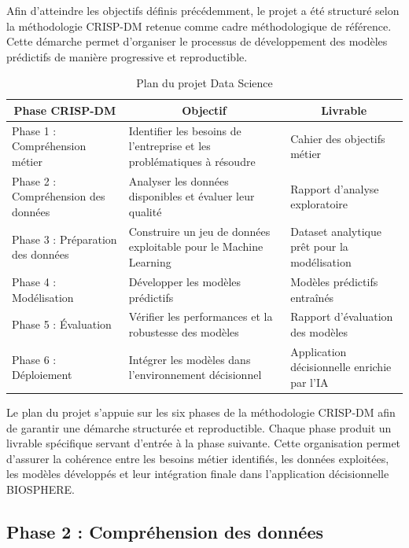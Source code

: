 Afin d'atteindre les objectifs définis précédemment, le projet a été structuré selon la méthodologie CRISP-DM retenue comme cadre méthodologique de référence. Cette démarche permet d'organiser le processus de développement des modèles prédictifs de manière progressive et reproductible.
 
\begin{table}[H]
\centering
\caption{Plan du projet Data Science}
\label{tab:ch4:plan_projet}
\small
\begin{tabular}{|p{3.5cm}|p{5.5cm}|p{5cm}|}
\hline
\multicolumn{1}{|c|}{\textbf{Phase CRISP-DM}} & 
\multicolumn{1}{c|}{\textbf{Objectif}} & 
\multicolumn{1}{c|}{\textbf{Livrable}} \\
\hline
Phase 1 : Compréhension métier & Identifier les besoins de l'entreprise et les problématiques à résoudre & Cahier des objectifs métier \\
\hline
Phase 2 : Compréhension des données & Analyser les données disponibles et évaluer leur qualité & Rapport d'analyse exploratoire \\
\hline
Phase 3 : Préparation des données & Construire un jeu de données exploitable pour le Machine Learning & Dataset analytique prêt pour la modélisation \\
\hline
Phase 4 : Modélisation & Développer les modèles prédictifs & Modèles prédictifs entraînés \\
\hline
Phase 5 : Évaluation & Vérifier les performances et la robustesse des modèles & Rapport d'évaluation des modèles \\
\hline
Phase 6 : Déploiement & Intégrer les modèles dans l'environnement décisionnel & Application décisionnelle enrichie par l'IA \\
\hline
\end{tabular}
\end{table}
 
Le plan du projet s'appuie sur les six phases de la méthodologie CRISP-DM afin de garantir une démarche structurée et reproductible. Chaque phase produit un livrable spécifique servant d'entrée à la phase suivante. Cette organisation permet d'assurer la cohérence entre les besoins métier identifiés, les données exploitées, les modèles développés et leur intégration finale dans l'application décisionnelle BIOSPHERE.
 
\subsection{Phase 2 : Compréhension des données}
 
